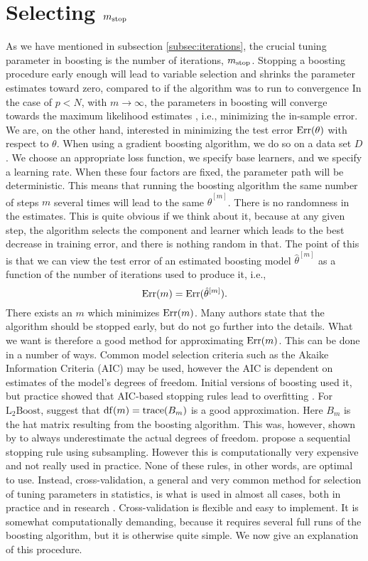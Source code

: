 
\section{Selecting $m_{\text{stop}}$}
\label{sec:stop}
As we have mentioned in subsection \ref{subsec:iterations}, the crucial tuning parameter in boosting is the number of iterations, $m_{\text{stop}}$. 
Stopping a boosting procedure early enough will lead to variable selection and shrinks the parameter estimates toward zero, compared to if the algorithm was to run to convergence
In the case of $p<N$, with $m\to\infty$, the parameters in boosting will converge towards the maximum likelihood estimates \citep{DeBin2016}, i.e., minimizing the in-sample error.
We are, on the other hand, interested in minimizing the test error $\text{Err}(\theta)$ with respect to $\theta$.
When using a gradient boosting algorithm, we do so on a data set $D$.
We choose an appropriate loss function, we specify base learners, and we specify a learning rate.
When these four factors are fixed, the parameter path will be deterministic.
This means that running the boosting algorithm the same number of steps $m$ several times will lead to the same $\hat{\theta}^{[m]}$.
There is no randomness in the estimates.
This is quite obvious if we think about it, because at any given step, the algorithm selects the component and learner which leads to the best decrease in training error, and there is nothing random in that.
The point of this is that we can view the test error of an estimated boosting model $\hat{\theta}^{[m]}$ as a function of the number of iterations used to produce it, i.e.,
\begin{equation}\label{test-error-m}
    \text{Err}(m)=\text{Err}(\hat{\theta}^{[m]}).
\end{equation}
There exists an $m$ which minimizes $\text{Err}(m)$.
Many authors state that the algorithm should be stopped early, but do not go further into the details.
What we want is therefore a good method for approximating $\text{Err}(m)$.
This can be done in a number of ways.
Common model selection criteria such as the Akaike Information Criteria (AIC) may be used, however the AIC is dependent on estimates of the model's degrees of freedom. 
Initial versions of boosting used it, but practice showed that AIC-based stopping rules lead to overfitting \citep{mayr-hofner}.
For $\text{L}_2\text{Boost}$, \citet{buhlmann2007} suggest that $\operatorname{df}(m)=\operatorname{trace}(B_m)$ is a good approximation.
Here $B_m$ is the hat matrix resulting from the boosting algorithm.
This was, however, shown by \citet{hastie2007} to always underestimate the actual degrees of freedom.
\citet{mayr-hofner} propose a sequential stopping rule using subsampling.
However this is computationally very expensive and not really used in practice.
None of these rules, in other words, are optimal to use.
Instead, cross-validation, a general and very common method for selection of tuning parameters in statistics, is what is used in almost all cases, both in practice and in research \citep{mayr14a,mayr14b,mayr17}.
Cross-validation is flexible and easy to implement.
It is somewhat computationally demanding, because it requires several full runs of the boosting algorithm, but it is otherwise quite simple.
We now give an explanation of this procedure.

